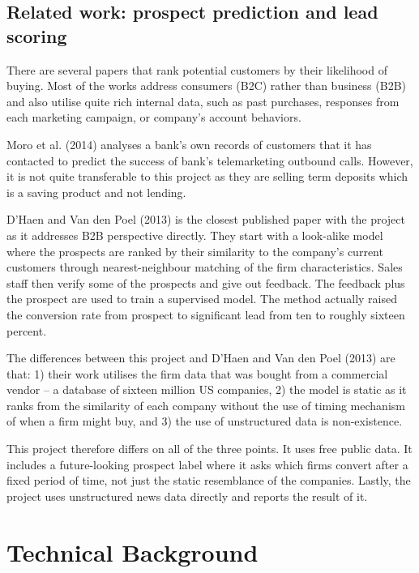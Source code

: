 \documentclass[ %
                    author={Natchalin Iwsakul \\ Inkaphol Siriwongwattana \\ Tanaphan Kummaraphat \\ Patorn Srisupap},
                supervisor={Fernando Moreno-Pino},
                    degree={MSc},
                     title={Propensity Modelling for SME Commercial Lending Using Open Public Data},
                  subtitle={Companies House filings and GDELT media coverage as predictors of first-time borrowing},
                      type={},
                      year={2026}]{dissertation}
\begin{document}
\subsection{Related work: prospect prediction and lead scoring}
\label{sec:relatedwork}

There are several papers that rank potential customers by their likelihood of buying. Most of the works address consumers (B2C) rather than business (B2B) and also utilise quite rich internal data, such as past purchases, responses from each marketing campaign, or company's account behaviors.

Moro et al. (2014) analyses a bank's own records of customers that it has contacted to predict the success of bank's telemarketing outbound calls. However, it is not quite transferable to this project as they are selling term deposits which is a saving product and not lending.

D'Haen and Van den Poel (2013) is the closest published paper with the project as it addresses B2B perspective directly. They start with a look-alike model where the prospects are ranked by their similarity to the company's current customers through nearest-neighbour matching of the firm characteristics. Sales staff then verify some of the prospects and give out feedback. The feedback plus the prospect are used to train a supervised model. The method actually raised the conversion rate from prospect to significant lead from ten to roughly sixteen percent.

The differences between this project and D'Haen and Van den Poel (2013) are that: 1) their work utilises the firm data that was bought from a commercial vendor -- a database of sixteen million US companies, 2) the model is static as it ranks from the similarity of each company without the use of timing mechanism of when a firm might buy, and 3) the use of unstructured data is non-existence.

This project therefore differs on all of the three points. It uses free public data. It includes a future-looking prospect label where it asks which firms convert after a fixed period of time, not just the static resemblance of the companies. Lastly, the project uses unstructured news data directly and reports the result of it. 

\section{Technical Background}
\label{sec:technical}
\end{document}
